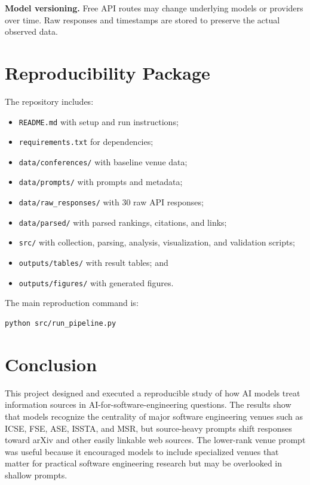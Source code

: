\documentclass[acmsmall,review,nonacm]{acmart}
\begin{document}
\textbf{Model versioning.} Free API routes may change underlying models or
providers over time. Raw responses and timestamps are stored to preserve the
actual observed data.

\section{Reproducibility Package}

The repository includes:

\begin{itemize}
  \item \texttt{README.md} with setup and run instructions;
  \item \texttt{requirements.txt} for dependencies;
  \item \texttt{data/conferences/} with baseline venue data;
  \item \texttt{data/prompts/} with prompts and metadata;
  \item \texttt{data/raw\_responses/} with 30 raw API responses;
  \item \texttt{data/parsed/} with parsed rankings, citations, and links;
  \item \texttt{src/} with collection, parsing, analysis, visualization, and
  validation scripts;
  \item \texttt{outputs/tables/} with result tables; and
  \item \texttt{outputs/figures/} with generated figures.
\end{itemize}

The main reproduction command is:

\begin{verbatim}
python src/run_pipeline.py
\end{verbatim}

\section{Conclusion}

This project designed and executed a reproducible study of how AI models treat
information sources in AI-for-software-engineering questions. The results show
that models recognize the centrality of major software engineering venues such
as ICSE, FSE, ASE, ISSTA, and MSR, but source-heavy prompts shift responses
toward arXiv and other easily linkable web sources. The lower-rank venue prompt
was useful because it encouraged models to include specialized venues that
matter for practical software engineering research but may be overlooked in
shallow prompts.
\end{document}
